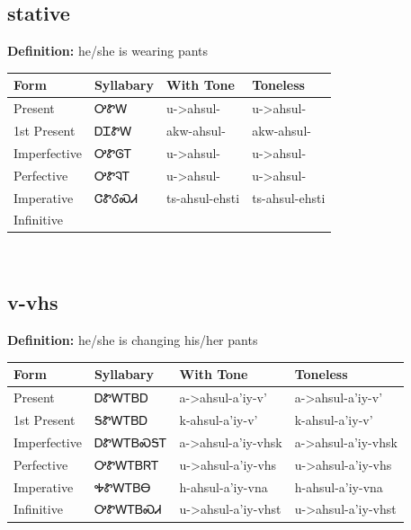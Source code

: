 \documentclass{article}%
\begin{document}
\subsection*{stative}%
\textbf{Definition: }%
he/she is wearing pants%
\\[0.5em]%
\begin{tabular}{|l|l|l|l|}%
\hline%
\textbf{Form}&\textbf{Syllabary}&\textbf{With Tone}&\textbf{Toneless}\\%
\hline%
Present&ᎤᏑᎳ&u{-}>ahsul{-}&u{-}>ahsul{-}\\%
1st Present&ᎠᏆᏑᎳ&akw{-}ahsul{-}&akw{-}ahsul{-}\\%
Imperfective&ᎤᏑᎶᎢ&u{-}>ahsul{-}&u{-}>ahsul{-}\\%
Perfective&ᎤᏑᎸᎢ&u{-}>ahsul{-}&u{-}>ahsul{-}\\%
Imperative&ᏣᏑᎴᏍᏗ&ts{-}ahsul{-}ehsti&ts{-}ahsul{-}ehsti\\%
Infinitive&&&\\%
\hline%
\end{tabular}%
\\[1em]%
\subsection*{v-vhs}%
\textbf{Definition: }%
he/she is changing his/her pants%
\\[0.5em]%
\begin{tabular}{|l|l|l|l|}%
\hline%
\textbf{Form}&\textbf{Syllabary}&\textbf{With Tone}&\textbf{Toneless}\\%
\hline%
Present&ᎠᏑᎳᎢᏴᎠ&a{-}>ahsul{-}a'iy{-}v'&a{-}>ahsul{-}a'iy{-}v'\\%
1st Present&ᎦᏑᎳᎢᏴᎠ&k{-}ahsul{-}a'iy{-}v'&k{-}ahsul{-}a'iy{-}v'\\%
Imperfective&ᎠᏑᎳᎢᏴᏍᎦᎢ&a{-}>ahsul{-}a'iy{-}vhsk&a{-}>ahsul{-}a'iy{-}vhsk\\%
Perfective&ᎤᏑᎳᎢᏴᏒᎢ&u{-}>ahsul{-}a'iy{-}vhs&u{-}>ahsul{-}a'iy{-}vhs\\%
Imperative&ᎭᏑᎳᎢᏴᎾ&h{-}ahsul{-}a'iy{-}vna&h{-}ahsul{-}a'iy{-}vna\\%
Infinitive&ᎤᏑᎳᎢᏴᏍᏗ&u{-}>ahsul{-}a'iy{-}vhst&u{-}>ahsul{-}a'iy{-}vhst\\%
\hline%
\end{tabular}%
\\[1em]%
\end{document}
